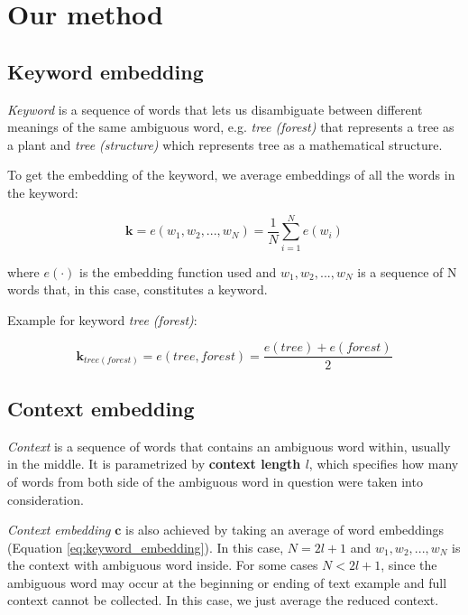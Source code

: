 \documentclass{llncs}
\begin{document}
\section{Our method}
\subsection{Keyword embedding}
\label{sec:kw_embed}
\textit{Keyword} is a sequence of words that lets us disambiguate between different meanings of the same ambiguous word, e.g. \textit{tree (forest)} that represents a tree as a plant and \textit{tree (structure)} which represents tree as a mathematical structure.

To get the embedding of the keyword, we average embeddings of all the words in the keyword:

\begin{equation}
    \label{eq:keyword_embedding}
    \bm{k} = e(w_1, w_2, ..., w_N) = \frac{1}{N}\sum_{i=1}^{N} e(w_i)
\end{equation}

where \(e(\cdot)\) is the embedding function used and \(w_1, w_2, ..., w_N\) is a sequence of N words that, in this case, constitutes a keyword.

Example for keyword \textit{tree (forest)}:

\begin{equation}
    \label{eq:example_kw_embed}
    \bm{k}_{tree (forest)} = e(tree, forest) = \frac{e(tree) + e(forest)}{2}
\end{equation}

\subsection{Context embedding}
\label{sec:ctx_embed}
\textit{Context} is a sequence of words that contains an ambiguous word within, usually in the middle.
It is parametrized by \textbf{context length \(l\)}, which specifies how many of words from both side of the ambiguous word in question were taken into consideration.

\textit{Context embedding} \(\bm{c}\) is also achieved by taking an average of word embeddings (Equation \ref{eq:keyword_embedding}).
In this case, \(N = 2l + 1\) and \(w_1, w_2, ..., w_N\) is the context with ambiguous word inside. For some cases \(N < 2l + 1\), since the ambiguous word may occur at the beginning or ending of text example and full context cannot be collected.
In this case, we just average the reduced context.
\end{document}
